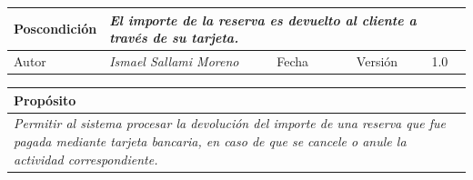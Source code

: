 \begin{table}[H]
\begin{tabular}{llllllll}
    \multicolumn{1}{|l|}{Poscondición}                           & \multicolumn{7}{l|}{{\color[HTML]{808080} \textit{El importe de la reserva es devuelto al cliente a través de su tarjeta.}}}                                                                                                                                                                                                                                                       \\ \hline
    \multicolumn{1}{|l|}{Autor}                                  & \multicolumn{1}{l|}{{\color[HTML]{808080} \textit{Ismael Sallami Moreno}}}                           & \multicolumn{2}{l|}{Fecha}                                                   & \multicolumn{1}{l|}{}                          & \multicolumn{2}{l|}{Versión}                                                      & \multicolumn{1}{l|}{1.0}                                                     \\ \hline
    \end{tabular}
    \end{table}

    \begin{table}[H]
        \begin{tabular}{llllllll}
    \hline
    \multicolumn{8}{|l|}{\cellcolor[HTML]{F2F2F2}Propósito}                                                                                                                                                                                                                                                                                                                                                                                           \\ \hline
    \multicolumn{8}{|p{15cm}|}{{\color[HTML]{808080} \textit{Permitir al sistema procesar la devolución del importe de una reserva que fue pagada mediante tarjeta bancaria, en caso de que se cancele o anule la actividad correspondiente.}}}                                                                                                                                                                                                             \\ \hline
    \end{tabular}
    \end{table}

